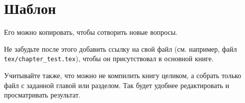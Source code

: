 \documentclass[../../main.tex]{subfiles}
\begin{document}
\chapter{Шаблон}

Его можно копировать, чтобы сотворить новые вопросы.

Не забудьте после этого добавить ссылку на свой файл
(см. например, файл \texttt{tex/chapter\_test.tex}), 
чтобы он присутствовал в основной книге.

Учитывайте также, что можно не компилить книгу целиком, а собрать только файл 
с заданной главой или разделом. Так будет удобнее редактировать 
и просматривать результат.
\end{document}
